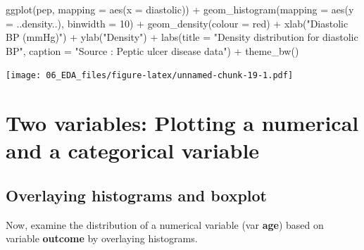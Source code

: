 \documentclass[
  10pt,
]{krantz}
\newenvironment{Shaded}{\begin{snugshade}}{\end{snugshade}}
\newcommand{\AttributeTok}[1]{\textcolor[rgb]{0.77,0.63,0.00}{#1}}
\newcommand{\DecValTok}[1]{\textcolor[rgb]{0.00,0.00,0.81}{#1}}
\newcommand{\FunctionTok}[1]{\textcolor[rgb]{0.00,0.00,0.00}{#1}}
\newcommand{\NormalTok}[1]{#1}
\newcommand{\SpecialCharTok}[1]{\textcolor[rgb]{0.00,0.00,0.00}{#1}}
\newcommand{\StringTok}[1]{\textcolor[rgb]{0.31,0.60,0.02}{#1}}
\begin{document}
\begin{Shaded}
\begin{Highlighting}[]
\FunctionTok{ggplot}\NormalTok{(pep, }\AttributeTok{mapping =} \FunctionTok{aes}\NormalTok{(}\AttributeTok{x =}\NormalTok{ diastolic)) }\SpecialCharTok{+} 
  \FunctionTok{geom\_histogram}\NormalTok{(}\AttributeTok{mapping =} \FunctionTok{aes}\NormalTok{(}\AttributeTok{y =}\NormalTok{ ..density..), }\AttributeTok{binwidth =} \DecValTok{10}\NormalTok{) }\SpecialCharTok{+} 
  \FunctionTok{geom\_density}\NormalTok{(}\AttributeTok{colour =} \StringTok{\textquotesingle{}red\textquotesingle{}}\NormalTok{) }\SpecialCharTok{+}
  \FunctionTok{xlab}\NormalTok{(}\StringTok{"Diastolic BP (mmHg)"}\NormalTok{) }\SpecialCharTok{+}
  \FunctionTok{ylab}\NormalTok{(}\StringTok{"Density"}\NormalTok{) }\SpecialCharTok{+}
  \FunctionTok{labs}\NormalTok{(}\AttributeTok{title =} \StringTok{"Density distribution for diastolic BP"}\NormalTok{,}
       \AttributeTok{caption =} \StringTok{"Source : Peptic ulcer disease data"}\NormalTok{) }\SpecialCharTok{+}
  \FunctionTok{theme\_bw}\NormalTok{()}
\end{Highlighting}
\end{Shaded}

\texttt{[image: 06\_EDA\_files/figure-latex/unnamed-chunk-19-1.pdf]}

\hypertarget{two-variables-plotting-a-numerical-and-a-categorical-variable}{%
\section{\texorpdfstring{Two variables: Plotting a numerical and a categorical variable}{Two variables: Plotting a numerical and a categorical variable}}\label{two-variables-plotting-a-numerical-and-a-categorical-variable}}

\hypertarget{overlaying-histograms-and-boxplot}{%
\subsection{\texorpdfstring{Overlaying histograms and boxplot}{Overlaying histograms and boxplot}}\label{overlaying-histograms-and-boxplot}}

Now, examine the distribution of a numerical variable (var \textbf{age}) based on variable \textbf{outcome} by overlaying histograms.
\end{document}
